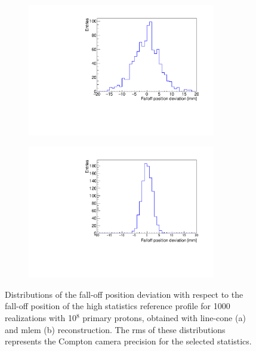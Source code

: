 \begin{figure}
\begin{subfigure}[b]{.5\textwidth}
\centering
\includegraphics[width=0.9\textwidth]{03_GraphicFiles/chapter4_HTsimu/new/LC_histo_deviations.pdf}
\caption{}
\label{chap4::fig::fig_Results_Precision_Distribution_Variation_CC_simulation_Hadronth_LC}
\end{subfigure}
\begin{subfigure}[b]{.5\textwidth}
\centering
\includegraphics[width=0.9\textwidth]{03_GraphicFiles/chapter4_HTsimu/new/MLEM_histo_deviations.pdf}
\caption{}
\label{chap4::fig::fig_Results_Precision_Distribution_Variation_CC_simulation_Hadronth_MLEM} 
\end{subfigure}
\caption{Distributions of the fall-off position deviation with respect to the fall-off position of the high statistics reference profile for 1000 realizations with 10$^8$ primary protons, obtained with line-cone (a) and \gls{mlem} (b) reconstruction. The \gls{rms} of these distributions represents the Compton camera precision for the selected statistics.}
 \end{figure}

